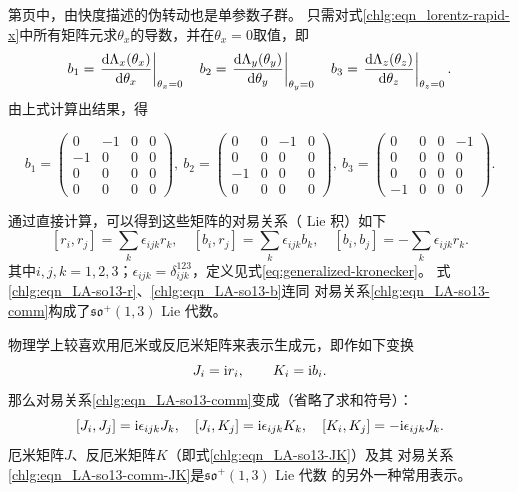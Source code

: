 第\pageref{chlg:sec_rapid}页中，由快度描述的伪转动也是单参数子群。
只需对式\eqref{chlg:eqn_lorentz-rapid-x}中所有矩阵元求$\theta_x$的导数，并在$\theta_x=0$取值，即
\begin{equation}
    b_1=\left.\frac{\dd \Lambda_x(\theta_x)}{\dd \theta_x}\right|_{\theta_x=0} \quad
    b_2=\left.\frac{\dd \Lambda_y(\theta_y)}{\dd \theta_y}\right|_{\theta_y=0} \quad
    b_3=\left.\frac{\dd \Lambda_z(\theta_z)}{\dd \theta_z}\right|_{\theta_z=0} .
\end{equation}
由上式计算出结果，得
\begin{small}

\begin{equation}\label{chlg:eqn_LA-so13-b}
    b_1=  \begin{pmatrix}
        0  & -1 & 0 & 0 \\
        -1 & 0  & 0 & 0 \\
        0 & 0 & 0 & 0 \\
        0 & 0 & 0 & 0
    \end{pmatrix},\
    b_2 =  \begin{pmatrix}
        0  & 0 & -1 & 0 \\
        0 & 0  & 0 & 0 \\
        -1 & 0 & 0 & 0 \\
        0 & 0 & 0 & 0
    \end{pmatrix},\
    b_3 =  \begin{pmatrix}
        0  & 0 & 0 & -1 \\
        0 & 0  & 0 & 0 \\
        0 & 0 & 0 & 0 \\
        -1 & 0 & 0 & 0
    \end{pmatrix} .
\end{equation}
\end{small}

通过直接计算，可以得到这些矩阵的对易关系（ Lie 积）如下
\begin{equation}\label{chlg:eqn_LA-so13-comm}
    [r_i, r_j] = \sum_k \epsilon_{ijk} r_k,\quad
    [b_i, r_j] = \sum_k \epsilon_{ijk} b_k,\quad
    [b_i, b_j] = -\sum_k \epsilon_{ijk} r_k.
\end{equation}
其中$i,j,k=1,2,3$；$\epsilon_{ijk}=\delta^{123}_{ijk}$，定义见式\eqref{eq:generalized-kronecker}。
式\eqref{chlg:eqn_LA-so13-r}、\eqref{chlg:eqn_LA-so13-b}连同
对易关系\eqref{chlg:eqn_LA-so13-comm}构成了$\mathfrak{so}^{+}(1,3)$ Lie 代数。

物理学上较喜欢用厄米或反厄米矩阵来表示生成元，即作如下变换
\begin{equation}\label{chlg:eqn_LA-so13-JK}
    J_i = \mathrm{i} r_i,\qquad  K_i = \mathrm{i} b_i .
\end{equation}
那么对易关系\eqref{chlg:eqn_LA-so13-comm}变成（省略了求和符号）：
\begin{equation}\label{chlg:eqn_LA-so13-comm-JK}
    [J_i, J_j] = \mathrm{i} \epsilon_{ijk} J_k,\quad
    [J_i, K_j] = \mathrm{i} \epsilon_{ijk} K_k,\quad
    [K_i, K_j] = -\mathrm{i} \epsilon_{ijk} J_k.
\end{equation}
厄米矩阵$J$、反厄米矩阵$K$（即式\eqref{chlg:eqn_LA-so13-JK}）及其
对易关系\eqref{chlg:eqn_LA-so13-comm-JK}是$\mathfrak{so}^{+}(1,3)$ Lie 代数
的另外一种常用表示。

